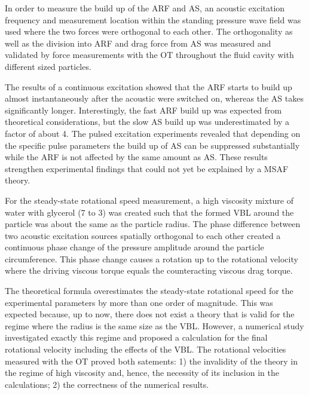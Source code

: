 In order to measure the build up of the ARF and AS, an acoustic excitation 
frequency and measurement location within the standing pressure wave field was 
used where the two forces were orthogonal to each other. The orthogonality as 
well as the division into ARF and drag force from AS was measured and validated 
by force measurements with the OT throughout the fluid cavity with different 
sized particles.

The results of a continuous excitation showed that the ARF starts to build up 
almost instantaneously after the acoustic were switched on, whereas the AS 
takes significantly longer. Interestingly, the fast ARF build up was expected 
from theoretical considerations, but the slow AS build up was underestimated by 
a factor of about 4. The pulsed excitation experiments revealed that depending 
on the specific pulse parameters the build up of AS can be suppressed 
substantially while the ARF is not affected by the same amount as AS. These 
results strengthen experimental findings that could not yet be explained by a 
MSAF theory.

For the steady-state rotational speed measurement, a high viscosity mixture of 
water with glycerol (7 to 3) was created such that the formed VBL around the 
particle was about the same as the particle radius. The phase difference 
between two acoustic excitation sources spatially orthogonal to each other 
created a continuous phase change of the pressure amplitude around the particle 
circumference. This phase change causes a rotation up to the rotational 
velocity where the driving viscous torque equals the counteracting viscous drag 
torque.

The theoretical formula overestimates the steady-state rotational speed for the 
experimental parameters by more than one order of magnitude. This was expected 
because, up to now, there does not exist a theory that is valid for the regime 
where the radius is the same size as the VBL. However, a numerical study 
investigated exactly this regime and proposed a calculation for the final 
rotational velocity including the effects of the VBL. The rotational velocities 
measured with the OT proved both satements: 1) the invalidity of the theory in 
the regime of high viscosity and, hence, the necessity of its inclusion in the 
calculations; 2) the correctness of the numerical results.


